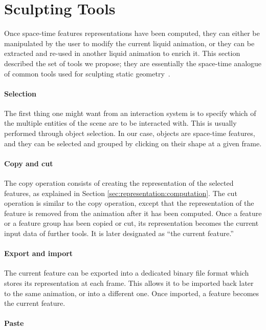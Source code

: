 \documentclass[review]{acmsiggraph}
\begin{document}
\section{Sculpting Tools}
\label{sec:manipulation}
Once space-time features representations have been computed, they can either be manipulated by the user to modify the current liquid animation, or they can be extracted and re-used in another liquid animation to enrich it.
This section described the set of tools we propose; they are essentially the space-time analogue of common tools used for sculpting static geometry~\cite{Ferley2000,schmidt2010meshmixer,Takayama2011}.

\paragraph{Selection}

The first thing one might want from an interaction system is to specify which of the multiple entities of the scene are to be interacted with.
This is usually performed through object selection.
In our case, objects are space-time features, and they can be selected and grouped by clicking on their shape at a given frame.

\paragraph{Copy and cut}

The copy operation consists of creating the representation of the selected features, as explained in Section \ref{sec:representation:computation}.
The cut operation is similar to the copy operation, except that the representation of the feature is removed from the animation after it has been computed. 
Once a feature or a feature group has been copied or cut, its representation becomes the current input data of further tools.
It is later designated as ``the current feature.''

\paragraph{Export and import}

The current feature can be exported into a dedicated binary file format which stores its representation at each frame.
This allows it to be imported back later to the same animation, or into a different one.
Once imported, a feature becomes the current feature.

\paragraph{Paste}
\end{document}
